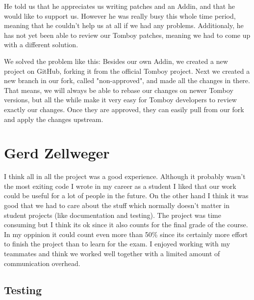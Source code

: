 \documentclass[11pt,a4paper,titlepage]{article}
\begin{document}
He told us that he appreciates us writing patches and an Addin, and that he would like to support us. However he was really busy this whole time period, meaning that he couldn't help us at all if we had any problems. Additionaly, he has not yet been able to review our Tomboy patches, meaning we had to come up with a different solution.

We solved the problem like this: Besides our own Addin, we created a new project on GitHub, forking it from the official Tomboy project. Next we created a new branch in our fork, called "non-approved", and made all the changes in there. That means, we will always be able to rebase our changes on newer Tomboy versions, but all the while make it very easy for Tomboy developers to review exactly our changes. Once they are approved, they can easily pull from our fork and apply the changes upstream.

\section{Gerd Zellweger}

I think all in all the project was a good experience. Although it probably wasn't the most exiting code I wrote in my career as a student I liked that our work could be useful for a lot of people in the future. On the other hand I think it was good that we had to care about the stuff which normally doesn't matter in student projects (like documentation and testing). The project was time consuming but I think its ok since it also counts for the final grade of the course. In my oppinion it could count even more than 50\% since its certainly more effort to finish the project than to learn for the exam.
I enjoyed working with my teammates and think we worked well together with a limited amount of communication overhead.

\subsection{Testing}
\end{document}
